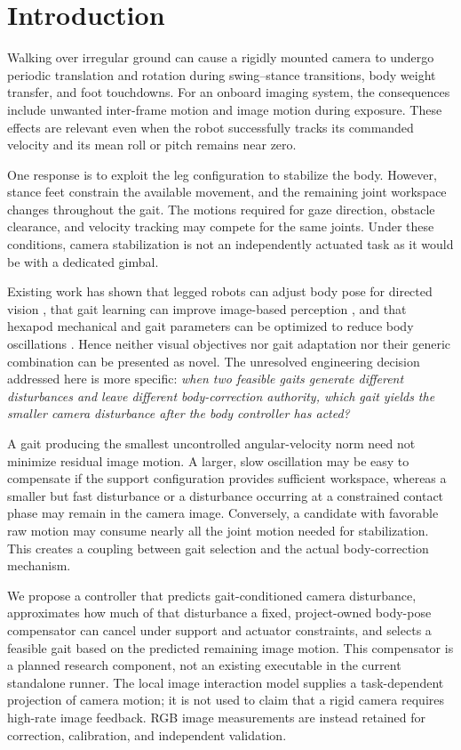 \section{Introduction}
Walking over irregular ground can cause a rigidly mounted camera to undergo periodic translation and rotation during swing--stance transitions, body weight transfer, and foot touchdowns. For an onboard imaging system, the consequences include unwanted inter-frame motion and image motion during exposure. These effects are relevant even when the robot successfully tracks its commanded velocity and its mean roll or pitch remains near zero.

One response is to exploit the leg configuration to stabilize the body. However, stance feet constrain the available movement, and the remaining joint workspace changes throughout the gait. The motions required for gaze direction, obstacle clearance, and velocity tracking may compete for the same joints. Under these conditions, camera stabilization is not an independently actuated task as it would be with a dedicated gimbal.

Existing work has shown that legged robots can adjust body pose for directed vision \cite{shaw2019}, that gait learning can improve image-based perception \cite{saggar2007}, and that hexapod mechanical and gait parameters can be optimized to reduce body oscillations \cite{burkus2022,yin2024}. Hence neither visual objectives nor gait adaptation nor their generic combination can be presented as novel. The unresolved engineering decision addressed here is more specific: \emph{when two feasible gaits generate different disturbances and leave different body-correction authority, which gait yields the smaller camera disturbance after the body controller has acted?}

A gait producing the smallest uncontrolled angular-velocity norm need not minimize residual image motion. A larger, slow oscillation may be easy to compensate if the support configuration provides sufficient workspace, whereas a smaller but fast disturbance or a disturbance occurring at a constrained contact phase may remain in the camera image. Conversely, a candidate with favorable raw motion may consume nearly all the joint motion needed for stabilization. This creates a coupling between gait selection and the actual body-correction mechanism.

We propose a controller that predicts gait-conditioned camera disturbance, approximates how much of that disturbance a fixed, project-owned body-pose compensator can cancel under support and actuator constraints, and selects a feasible gait based on the predicted remaining image motion. This compensator is a planned research component, not an existing executable in the current standalone runner. The local image interaction model supplies a task-dependent projection of camera motion; it is not used to claim that a rigid camera requires high-rate image feedback. RGB image measurements are instead retained for correction, calibration, and independent validation.


